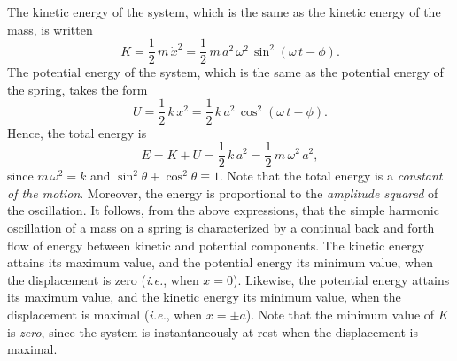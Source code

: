 The kinetic energy of the system, which is the same as the kinetic energy of the mass,  is written
\begin{equation}
K = \frac{1}{2}\,m\,\dot{x}^2 = \frac{1}{2}\,m\,a^2\,\omega^2\,\sin^2(\omega\,t-\phi).
\end{equation}
 The potential energy of the system, which is the same as the potential energy of the
 spring, takes the form
\begin{equation}
U = \frac{1}{2}\,k\,x^2= \frac{1}{2}\,k\,a^2\,\cos^2(\omega\,t-\phi).
\end{equation}
Hence, the total energy is
\begin{equation}\label{eosce}
E = K + U =\frac{1}{2} \,k\,a^2= \frac{1}{2}\,m\,\omega^2\,a^2,
\end{equation}
since $m\,\omega^2 = k$ and $\sin^2\theta+\cos^2\theta \equiv 1$. Note that the
total energy is a {\em constant of the motion}. Moreover,
the energy is proportional to the {\em amplitude squared}\/ of the oscillation.
It follows, from the above expressions, that the simple harmonic oscillation of a
mass on a spring is characterized
by a continual back and forth flow of energy between kinetic and potential components.
The kinetic energy attains its maximum value, and the potential energy its minimum value,  when the displacement is zero ({\em i.e.}, when $x=0$). Likewise,
the potential energy attains its maximum value, and the kinetic energy 
its minimum value, when the displacement is maximal ({\em i.e.}, when $x=\pm a$). 
Note that the minimum value of $K$ is {\em zero}, since the system is instantaneously at rest
when the displacement is maximal.

